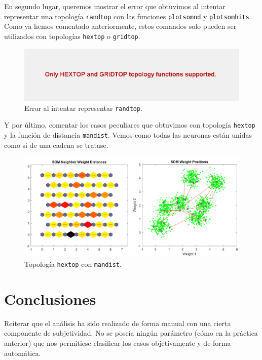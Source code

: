 \documentclass[a4paper,12pt,titlepage]{article}
\begin{document}
En segundo lugar, queremos mostrar el error que obtuvimos al intentar representar una topología \lstinline|randtop| con las funciones \lstinline|plotsomnd| y \lstinline|plotsomhits|. Como ya hemos comentado anteriormente, estos comandos solo pueden ser utilizados con topologías \lstinline|hextop| o \lstinline|gridtop|.

\begin{figure}[!ht]
	\centering
	\label{fig:error-randtop}
	\includegraphics[width=\textwidth]{error-randtop.png}
	\caption{Error al intentar representar \lstinline|randtop|.}
\end{figure}

Y por último, comentar los casos peculiares que obtuvimos con topología \lstinline|hextop| y la función de distancia \lstinline|mandist|. Vemos como todas las neuronas están unidas como si de una cadena se tratase.

\begin{figure}[!ht]
	\centering
	\label{fig:hextop-mandist}
	\includegraphics[width=\textwidth]{hextop-mandist.png}
	\caption{Topología \lstinline|hextop| con \lstinline|mandist|.}
\end{figure}

\section{Conclusiones}

Reiterar que el análisis ha sido realizado de forma manual con una cierta componente de subjetividad. No se poseía ningún parámetro (cómo en la práctica anterior) que nos permitiese clasificar los casos objetivamente y de forma automática.
\end{document}
